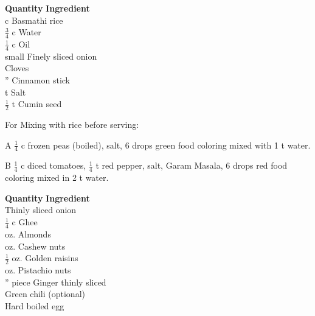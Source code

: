 \begin{tabbing}
\hspace{1.0cm}  \={\bf Quantity}   \hspace{3.0cm} \={\bf Ingredient}\\

 c\> Basmathi rice\\
 $\frac{3}{4}$ c \>Water\\
\>  $\frac{1}{4}$ c \>Oil\\
 small \>Finely sliced onion\\
 \>Cloves\\
'' \>Cinnamon stick\\
 t \>Salt \\
\>$\frac{1}{2}$ t \>Cumin seed\\
\end{tabbing}

For Mixing with rice before serving:

A  $\frac{1}{4}$ c frozen peas (boiled), salt, 6 drops green food coloring mixed with
   1 t water.

B  $\frac{1}{4}$ c diced tomatoes, $\frac{1}{4}$ t red pepper, salt, Garam Masala, 6 drops red
   food coloring mixed in 2 t water.
\begin{tabbing}
\hspace{1.0cm}  \={\bf Quantity}   \hspace{3.0cm} \={\bf Ingredient}\\

 \>Thinly sliced onion\\
 $\frac{1}{4}$ c \>Ghee\\
 oz. \>Almonds\\
 oz. \>Cashew nuts\\
 $\frac{1}{2}$ oz. \>Golden raisins\\
 oz. \>Pistachio nuts\\
'' piece \>Ginger thinly sliced \\
 \>Green chili (optional)\\
 \>Hard boiled egg\\
\end{tabbing}

